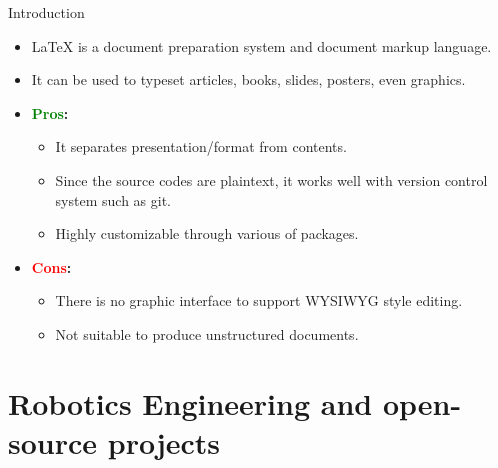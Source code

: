 \documentclass[xcolor={dvipsnames},aspectratio=169,10pt]{beamer}
\begin{document}
\begin{frame}{Introduction}
  \begin{itemize}
    \item \alert{\LaTeX{}} is a document preparation system and document markup language.
    \item It can be used to typeset articles, books, slides, posters, even graphics.
    \item \textbf{\textcolor{Green}{Pros}:}
          \begin{itemize}
            \item It separates presentation/format from contents.
            \item Since the source codes are plaintext, it works well with version control system such as git.
            \item Highly customizable through various of packages.
          \end{itemize}
    \item \textbf{\textcolor{Red}{Cons}:}
          \begin{itemize}
            \item There is no graphic interface to support WYSIWYG style editing.
            \item Not suitable to produce unstructured documents.
          \end{itemize}
  \end{itemize}
\end{frame}


\section{Robotics Engineering and open-source projects}
\end{document}
